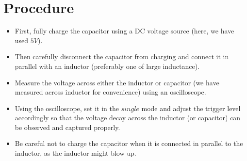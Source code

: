 \documentclass[a4paper,12pt]{article}
\begin{document}
\section{Procedure}
\begin{itemize}
    \item First, fully charge the capacitor using a DC voltage source (here, we have used $5V$).
    \item Then carefully disconnect the capacitor from charging and connect it in parallel with an inductor (preferably one of large inductance). 
    \item Measure the voltage across either the inductor or capacitor (we have measured across inductor for convenience) using an oscilloscope. 
    \item Using the oscilloscope, set it in the $single$ mode and adjust the trigger level accordingly so that the voltage decay across the inductor (or capacitor) can be observed and captured properly. 
    \item Be careful not to charge the capacitor when it is connected in parallel to the inductor, as the inductor might blow up.
\end{itemize}
\end{document}
